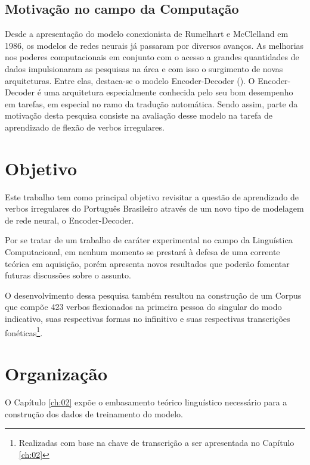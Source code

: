 \subsection{Motivação no campo da Computação}

Desde a apresentação do modelo conexionista de Rumelhart e McClelland em 1986, os modelos de redes neurais já passaram por diversos avanços. As melhorias nos poderes computacionais em conjunto com o acesso a grandes quantidades de dados impulsionaram as pesquisas na área e com isso o surgimento de novas arquiteturas. Entre elas, destaca-se o modelo Encoder-Decoder (\cite{enc-dec:2014}). O Encoder-Decoder é uma arquitetura especialmente conhecida pelo seu bom desempenho em tarefas, em especial no ramo da tradução automática. Sendo assim, parte da motivação desta pesquisa consiste na avaliação desse modelo na tarefa de aprendizado de flexão de verbos irregulares. 


\section{Objetivo}
\label{sec:objectives}

Este trabalho tem como principal objetivo revisitar a questão de aprendizado de verbos irregulares do Português Brasileiro através de um novo tipo de modelagem de rede neural, o Encoder-Decoder. 

Por se tratar de um trabalho de caráter experimental no campo da Linguística Computacional, em nenhum momento se prestará à defesa de uma corrente teórica em aquisição, porém apresenta novos resultados que poderão fomentar futuras discussões sobre o assunto. 

O desenvolvimento dessa pesquisa também resultou na construção de um Corpus que compõe 423 verbos flexionados na primeira pessoa do singular do modo indicativo, suas respectivas formas no infinitivo e suas respectivas transcrições fonéticas\footnote{Realizadas com base na chave de transcrição a ser apresentada no Capítulo \ref{ch:02}}.


\section{Organização}
\label{sec:organization}

O Capítulo \ref{ch:02} expõe o embasamento teórico linguístico necessário para a construção dos dados de treinamento do modelo. 

